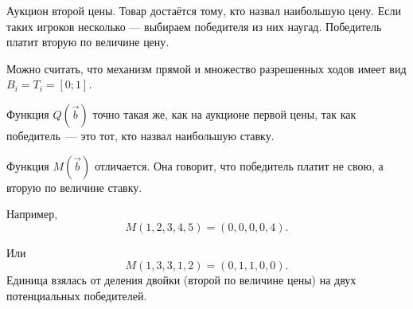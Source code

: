 \begin{myex} Аукцион второй цены. Товар достаётся тому, кто назвал наибольшую цену. Если таких игроков несколько — выбираем победителя из них наугад. Победитель платит вторую по величине цену.

Можно считать, что механизм прямой и множество разрешенных ходов имеет вид $B_{i}=T_{i}=[0;1] $.

Функция $ Q(\vec{b}) $ точно такая же, как на аукционе первой цены, так как победитель~— это тот, кто назвал наибольшую ставку.

Функция $ M(\vec{b}) $ отличается. Она говорит, что победитель платит не свою, а вторую по величине ставку.

Например,
\begin{equation}
M(1,2,3,4,5)=(0,0,0,0,4).
\end{equation}

Или
\begin{equation}
M(1,3,3,1,2)=(0,1,1,0,0).
\end{equation}
Единица взялась от деления двойки (второй по величине цены) на двух потенциальных победителей.

\end{myex}

